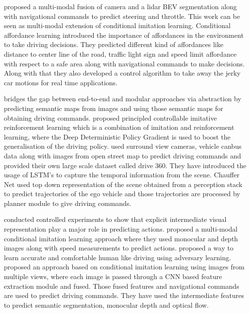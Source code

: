 \cite{Sobh2018EndToEndMS} proposed a multi-modal fusion of camera and a lidar BEV segmentation along with navigational commands to predict steering and throttle. This work can be seen as multi-modal extension of conditional imitation learning. Conditional affordance learning \cite{DBLP:journals/corr/abs-1806-06498} introduced the importance of affordances in the environment to take driving decisions. They predicted different kind of affordances like distance to center line of the road, traffic light sign and speed limit affordance with respect to a safe area along with navigational commands to make decisions. Along with that they also developed a control algorithm to take away the jerky car motions for real time applications. 

\cite{DBLP:journals/corr/abs-1804-09364} bridges the gap between end-to-end and modular approaches via abstraction by predicting semantic maps from images and using those semantic maps for obtaining driving commands. \cite{DBLP:journals/corr/abs-1807-03776} proposed principled controllable imitative reinforcement learning which is a combination of imitation and reinforcement learning, where the Deep Deterministic Policy Gradient is used to boost the generalisation of the driving policy. \cite{DBLP:journals/corr/abs-1803-10158} used surround view cameras, vehicle canbus data along with images from open street map to predict driving commands and provided their own large scale dataset called drive 360. They have introduced the usage of LSTM's to capture the temporal information from the scene. Chauffer Net \cite{DBLP:journals/corr/abs-1812-03079} used top down representation of the scene obtained from a perception stack to predict trajectories of the ego vehicle and those trajectories are processed by planner module to give driving commands. 

\cite{DBLP:journals/corr/abs-1905-12887} conducted controlled experiments to show that explicit intermediate visual representation play a major role in predicting actions. \cite{DBLP:journals/corr/abs-1906-03199} proposed a multi-modal conditional imitation learning approach where they used monocular and depth images along with speed measurements to predict actions. \cite{DBLP:journals/corr/abs-1903-10995} proposed a way to learn accurate and comfortable human like driving  using adversary learning. \cite{DBLP:journals/corr/abs-1912-00177} proposed an approach based on conditional imitation learning using images from multiple views, where each image is passed through a CNN based feature extraction module and fused. Those fused features and navigational commands are used to predict driving commands. They have used the intermediate features to predict semantic segmentation, monocular depth and optical flow. 


